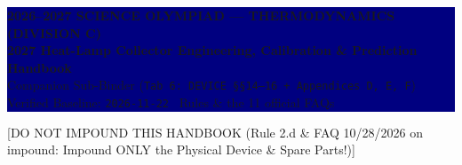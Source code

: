 \documentclass[10pt,twoside,openany,letterpaper]{book}
\begin{document}
\mainmatter

\thispagestyle{plain}

\noindent\colorbox{navy}{\parbox{\dimexpr\linewidth-2\fboxsep}{%
  \vspace{4pt}
  {\sffamily\bfseries\Large\color{white} 2026--2027 SCIENCE OLYMPIAD --- THERMODYNAMICS (DIVISION C)}\\[3pt]
  {\sffamily\bfseries\large\color{white} 2027 Heat-Lamp Collector Engineering, Calibration \& Prediction Handbook}\\[2pt]
  {\sffamily\footnotesize\color{white} Companion Sub-Binder (\texttt{Tab 6: DEVICE \S\S14--16 + Appendices D, E, F}) \hfill Verified Baseline: \texttt{2026-11-22} \textbar\ Rules \& the 11 official FAQs}
  \vspace{3pt}%
}}

\vspace{3pt}
[DO NOT IMPOUND THIS HANDBOOK (Rule 2.d \& FAQ 10/28/2026 on impound: Impound ONLY the Physical Device \& Spare Parts!)]
\end{document}
